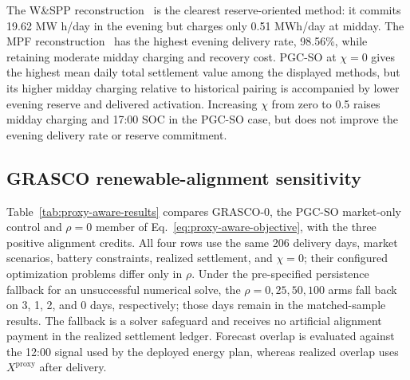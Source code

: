 \documentclass[11pt,a4paper]{article}
\begin{document}
The W\&SPP reconstruction~\cite{mancini2024} is the clearest reserve-oriented
method: it commits 19.62 MW h/day in the evening but charges only 0.51 MWh/day
at midday.  The MPF reconstruction~\cite{allawati2021} has the highest evening
delivery rate, 98.56\%, while retaining
moderate midday charging and recovery cost.  PGC-SO at $\chi=0$ gives the highest
mean daily total settlement value among
the displayed methods, but its higher midday charging relative to historical
pairing is accompanied by lower evening reserve and delivered activation.
Increasing $\chi$ from zero to 0.5 raises midday charging and 17:00 SOC in the
PGC-SO case, but does not improve the evening delivery rate or
reserve commitment.

\subsection{GRASCO renewable-alignment sensitivity}

Table~\ref{tab:proxy-aware-results} compares GRASCO-$0$, the PGC-SO market-only
control and $\rho=0$ member of Eq.~\eqref{eq:proxy-aware-objective},
with the three positive alignment credits.  All four rows use the same 206
delivery days, market scenarios, battery constraints, realized settlement, and
$\chi=0$; their configured optimization problems differ only in $\rho$.
Under the pre-specified persistence fallback for an unsuccessful numerical
solve, the $\rho=0,25,50,100$ arms fall back on 3, 1, 2, and 0 days,
respectively; those days remain in the matched-sample results.  The fallback
is a solver safeguard and receives no artificial alignment payment in the
realized settlement ledger.  Forecast overlap is evaluated against the
12:00 signal used by the deployed energy plan, whereas realized overlap uses
$X^{\mathrm{proxy}}$ after delivery.

\begin{table}[htbp]
  \centering
  \small
  \caption{GRASCO sensitivity on 206 common forecast-complete days
  (authors' calculations; GRASCO is proposed in this paper).}
  \label{tab:proxy-aware-results}
\end{table}
\end{document}
